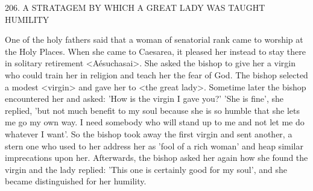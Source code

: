 206.
A STRATAGEM BY WHICH A GREAT
LADY WAS TAUGHT HUMILITY

One of the holy fathers said that a woman of senatorial rank came
to worship at the Holy Places.
When she came to Caesarea, it
pleased her instead to stay there in solitary retirement <Aésuchasai>.
She asked the bishop to give her a virgin who could train her in
religion and teach her the fear of God.
The bishop selected a
modest <virgin> and gave her to <the great lady>.
Sometime later
the bishop encountered her and asked: 'How is the virgin I gave
you?' 'She is fine', she replied, 'but not much benefit to my soul
because she is so humble that she lets me go my own way.
I need
somebody who will stand up to me and not let me do whatever I
want'.
So the bishop took away the first virgin and sent another, a
stern one who used to her address her as 'fool of a rich woman' and
heap similar imprecations upon her.
Afterwards, the bishop asked
her again how she found the virgin and the lady replied: 'This one
is certainly good for my soul', and she became distinguished for her
humility.

